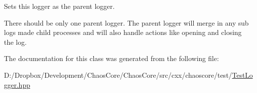 Sets this logger as the parent logger. 

There should be only one parent logger. The parent logger will merge in any sub logs made child processes and will also handle actions like opening and closing the log. 

The documentation for this class was generated from the following file\+:\begin{DoxyCompactItemize}
\item 
D\+:/\+Dropbox/\+Development/\+Chaos\+Core/\+Chaos\+Core/src/cxx/chaoscore/test/\hyperlink{_test_logger_8hpp}{Test\+Logger.\+hpp}\end{DoxyCompactItemize}
